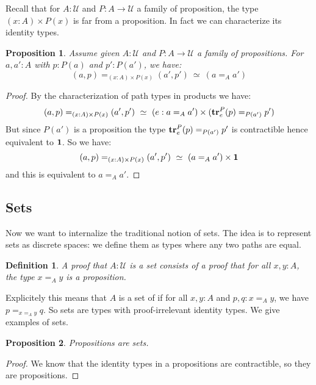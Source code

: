 \documentclass{article}
\newcommand{\sse}[1]{\medbreak \subsection{#1}}
\newcommand{\U}{{\mathcal U}}
\renewcommand{\r}{\rightarrow}
\newcommand{\tr}{\mathrm{\bf tr}}
\newcommand{\one}{{\bf 1}}
\newtheorem{definition}{Definition}
\newtheorem{proposition}{Proposition}
\begin{document}
Recall that for $A:\U$ and $P:A\r \U$ a family of proposition, the type $(x:A)\times P(x)$ is far from a proposition. In fact we can characterize its identity types.

\begin{proposition}
Assume given $A:\U$ and $P:A\r \U$ a family of propositions. For $a,a':A$ with $p:P(a)$ and $p':P(a')$, we have:
\[(a,p)=_{(x:A)\times P(x)} (a',p')\ \simeq \ (a=_Aa')\]
\end{proposition}
\begin{proof}
By the characterization of path types in products we have:
\[(a,p)=_{(x:A)\times P(x)} (a',p')\ \simeq \ (e:a=_Aa')\times(\tr^P_e(p) =_{P(a')} p') \]
But since $P(a')$ is a proposition the type $\tr^P_e(p) =_{P(a')} p'$ is contractible hence equivalent to $\one$. So we have:
\[(a,p)=_{(x:A)\times P(x)} (a',p')\ \simeq \ (a=_Aa')\times \one\]
and this is equivalent to $a=_Aa'$.
\end{proof}






\sse{Sets}

Now we want to internalize the traditional notion of sets. The idea is to represent sets as discrete spaces: we define them as types where any two paths are equal.

\begin{definition}
A proof that $A:\U$ is a set consists of a proof that for all $x,y:A$, the type $x=_A y$ is a proposition.
\end{definition}

Explicitely this means that $A$ is a set of if for all $x,y:A$ and $p,q:x=_Ay$, we have $p=_{x=_Ay} q$. So sets are types with proof-irrelevant identity types. We give examples of sets.

\begin{proposition}
Propositions are sets.
\end{proposition}
\begin{proof}
We know that the identity types in a propositions are contractible, so they are propositions.
\end{proof}
\end{document}

